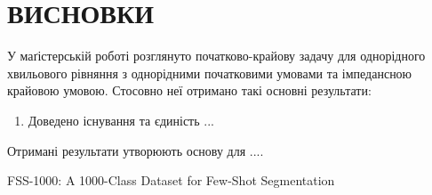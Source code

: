 \documentclass[a4paper,12pt,titlepage]{article}
\begin{document}
\section*{\centering ВИСНОВКИ}

У маґістерській роботі розглянуто початково-крайову задачу для однорідного хвильового рівняння з однорідними початковими умовами та імпедансною крайовою умовою. Стосовно неї отримано такі основні результати:

\begin{enumerate}

\item Доведено існування та єдиність ... 


\end{enumerate}

Отримані результати утворюють основу для ....



\newpage

\begin{thebibliography}{7}

 FSS-1000: A 1000-Class Dataset for Few-Shot Segmentation




\end{thebibliography}
\end{document}
